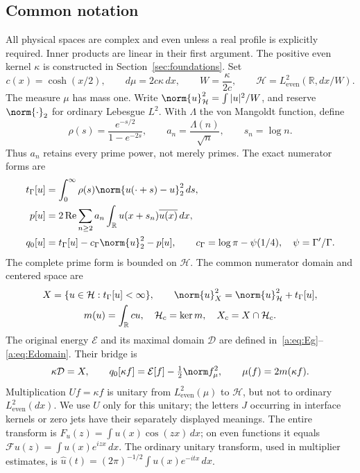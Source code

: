 \documentclass[11pt,a4paper]{article}
\numberwithin{equation}{section}
\theoremstyle{definition}\newtheorem{definition}[theorem]{Definition}
\theoremstyle{remark}\newtheorem{remark}[theorem]{Remark}
\newcommand{\R}{\mathbb R}\newcommand{\C}{\mathbb C}\newcommand{\N}{\mathbb N}
\newcommand{\E}{\mathcal E}\newcommand{\D}{\mathcal D}
\newcommand{\He}{L^2_{\mathrm{even}}(\mu)}\newcommand{\Le}{L^2_{\mathrm{even}}(dx)}
\newcommand{\Hh}{\mathcal H}\newcommand{\Hw}{\mathcal H}
\newcommand{\tg}{t_\Gamma}\newcommand{\cg}{c_\Gamma}
\begin{document}
\subsection{Common notation}
All physical spaces are complex and even unless a real profile is explicitly required. Inner products are linear in their first argument. The positive even kernel $\kappa$ is constructed in Section~\ref{sec:foundations}. Set
\begin{equation}\label{a:eq:weights}
 c(x)=\cosh(x/2),\qquad d\mu=2c\kappa\,dx,\qquad
 W=\frac{\kappa}{2c},\qquad \Hh=L^2_{\mathrm{even}}(\R,dx/W).
\end{equation}
The measure $\mu$ has mass one. Write $\norm{u}_{\Hh}^2=\int|u|^2/W$, and reserve $\norm{\cdot}_2$ for ordinary Lebesgue $L^2$. With $\Lambda$ the von Mangoldt function, define
\begin{equation}\label{eq:common-shifts}
 \rho(s)=\frac{e^{-s/2}}{1-e^{-2s}},\qquad
 a_n=\frac{\Lambda(n)}{\sqrt n},\qquad s_n=\log n.
\end{equation}
Thus $a_n$ retains every prime power, not merely primes. The exact numerator forms are
\begin{align}
 \tg[u]&=\int_0^\infty\rho(s)\norm{u(\cdot+s)-u}_2^2\,ds,\label{a:eq:physicalgamma}\\
 p[u]&=2\operatorname{Re}\sum_{n\ge2}a_n\int_\R u(x+s_n)\overline{u(x)}\,dx,\label{a:eq:physicalprime}\\
 q_0[u]&=\tg[u]-\cg\norm{u}_2^2-p[u],\qquad
 \cg=\log\pi-\psi(1/4),\quad\psi=\Gamma'/\Gamma.\label{a:eq:qzero}
\end{align}
The complete prime form is bounded on $\Hh$. The common numerator domain and centered space are
\begin{equation}\label{a:eq:X}
 \begin{gathered}
 X=\{u\in\Hh:\tg[u]<\infty\},\qquad
 \norm{u}_X^2=\norm{u}_{\Hh}^2+\tg[u],\\
 m(u)=\int_\R cu,\quad \Hh_c=\ker m,\quad X_c=X\cap\Hh_c.
 \end{gathered}
\end{equation}
The original energy $\E$ and its maximal domain $\D$ are defined in~\eqref{a:eq:Eg}--\eqref{a:eq:Edomain}. Their bridge is
\begin{equation}\label{eq:intro-bridge}
 \kappa\D=X,\qquad q_0[\kappa f]=\E[f]-\tfrac12\norm f_\mu^2,
 \qquad \mu(f)=2m(\kappa f).
\end{equation}
Multiplication $Uf=\kappa f$ is unitary from $\He$ to $\Hh$, but not to ordinary $\Le$. We use $U$ only for this unitary; the letters $J$ occurring in interface kernels or zero jets have their separately displayed meanings. The entire transform is $F_u(z)=\int u(x)\cos(zx)\,dx$; on even functions it equals $\mathcal Fu(z)=\int u(x)e^{izx}\,dx$. The ordinary unitary transform, used in multiplier estimates, is $\widehat u(t)=(2\pi)^{-1/2}\int u(x)e^{-itx}\,dx$.
\end{document}
